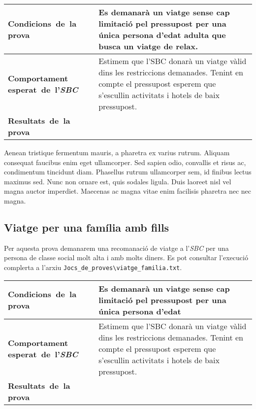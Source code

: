 \documentclass[11pt,a4paper]{article}
\begin{document}
\noindent
\begin{tabular}{|p{}|p{}|}
\hline
\textbf{\mbox{Condicions de la} \mbox{prova}} & Es demanarà un viatge sense cap limitació pel pressupost per una única persona d'edat adulta que busca un viatge de relax. \\
\hline
\textbf{Comportament \mbox{esperat de l'\emph{SBC}}} & Estimem que l'SBC donarà un viatge vàlid dins les restriccions demanades. Tenint en compte el pressupost esperem que s'escullin activitats i hotels de baix pressupost. \\
\hline
\textbf{\mbox{Resultats de la} \mbox{prova}} & \\
\hline
\end{tabular}

Aenean tristique fermentum mauris, a pharetra ex varius rutrum. Aliquam consequat faucibus enim eget ullamcorper. Sed sapien odio, convallis et risus ac, condimentum tincidunt diam. Phasellus rutrum ullamcorper sem, id finibus lectus maximus sed. Nunc non ornare est, quis sodales ligula. Duis laoreet nisl vel magna auctor imperdiet. Maecenas ac magna vitae enim facilisis pharetra nec nec magna.


\subsection{Viatge per una família amb fills}
Per aquesta prova demanarem una recomanació de viatge a l'\emph{SBC} per una persona de classe social molt alta i amb molts diners. Es pot consultar l'execució complerta a l'arxiu \texttt{Jocs\_de\_proves\textbackslash viatge\_familia.txt}. \\

\noindent
\begin{tabular}{|p{}|p{}|}
\hline
\textbf{\mbox{Condicions de la} \mbox{prova}} & Es demanarà un viatge sense cap limitació pel pressupost per una única persona d'edat \\
\hline
\textbf{Comportament \mbox{esperat de l'\emph{SBC}}} & Estimem que l'SBC donarà un viatge vàlid dins les restriccions demanades. Tenint en compte el pressupost esperem que s'escullin activitats i hotels de baix pressupost. \\
\hline
\textbf{\mbox{Resultats de la} \mbox{prova}} & \\
\hline
\end{tabular}
\end{document}
